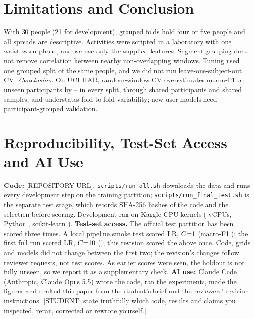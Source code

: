 \documentclass{article}
\begin{document}
\section{Limitations and Conclusion}
With 30 people (21 for development), grouped folds hold four or five people and all spreads are descriptive. Activities were scripted in a laboratory with one waist-worn phone, and we use only the supplied features. Segment grouping does not remove correlation between nearby non-overlapping windows. Tuning used one grouped split of the same people, and we did not run leave-one-subject-out CV. \emph{Conclusion.} On UCI HAR, random-window CV overestimates macro-F1 on unseen participants by \Ngapmodelmin--\Ngapmodelmax{} in every split, through shared participants and shared samples, and understates fold-to-fold variability; new-user models need participant-grouped validation.

\section{Reproducibility, Test-Set Access and AI Use}
\label{sec:repro}
\textbf{Code:} [REPOSITORY URL]. \texttt{scripts/run\_all.sh} downloads the data and runs every development step on the training partition; \texttt{scripts/run\_final\_test.sh} is the separate test stage, which records SHA-256 hashes of the code and the selection before scoring. Development ran on Kaggle CPU kernels (\Nncpu{} vCPUs, Python \Npyver, scikit-learn \Nsklearn).
\textbf{Test-set access.} The official test partition has been scored three times. A local pipeline smoke test scored LR, $C{=}1$ (macro-F1 \Nsmoketestf); the first full run scored LR, $C{=}10$ (\Nrunonetestf); this revision scored the \Nselmodel{} above once. Code, grids and models did not change between the first two; the revision's changes follow reviewer requests, not test scores. As earlier scores were seen, the holdout is not fully unseen, so we report it as a supplementary check.
\textbf{AI use:} Claude Code (Anthropic, Claude Opus 5.5) wrote the code, ran the experiments, made the figures and drafted this paper from the student's brief and the reviewers' revision instructions. [STUDENT: state truthfully which code, results and claims you inspected, reran, corrected or rewrote yourself.]
\end{document}
